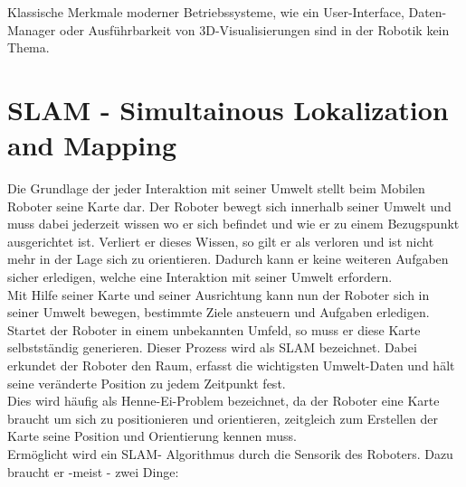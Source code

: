 \documentclass[twoside,12pt,a4paper]{report}
\begin{document}
	Klassische Merkmale moderner Betriebssysteme, wie ein User-Interface, Daten-Manager oder Ausführbarkeit von 3D-Visualisierungen sind in der Robotik kein Thema. 
	
	\section{SLAM - Simultainous Lokalization and Mapping }
	Die Grundlage der jeder Interaktion mit seiner Umwelt stellt beim Mobilen Roboter seine Karte dar. Der Roboter bewegt sich innerhalb seiner Umwelt und muss dabei jederzeit wissen wo er sich befindet und wie er zu einem Bezugspunkt ausgerichtet ist. Verliert er dieses Wissen, so gilt er als verloren und ist nicht mehr in der Lage sich zu orientieren. Dadurch kann er keine weiteren Aufgaben sicher erledigen, welche eine Interaktion mit seiner Umwelt erfordern. \\
	Mit Hilfe seiner Karte und seiner Ausrichtung kann nun der Roboter sich in seiner Umwelt bewegen, bestimmte Ziele ansteuern und Aufgaben erledigen. Startet der Roboter in einem unbekannten Umfeld, so muss er diese Karte selbstständig generieren. Dieser Prozess wird als SLAM bezeichnet. Dabei erkundet der Roboter den Raum, erfasst die wichtigsten Umwelt-Daten und hält seine veränderte Position zu jedem Zeitpunkt fest. \\
	Dies wird häufig als Henne-Ei-Problem bezeichnet, da der Roboter eine Karte braucht um sich zu positionieren und orientieren, zeitgleich zum Erstellen der Karte seine Position und Orientierung kennen muss.  \\
	Ermöglicht wird ein SLAM- Algorithmus durch die Sensorik des Roboters. Dazu braucht er -meist - zwei Dinge: 
\end{document}
